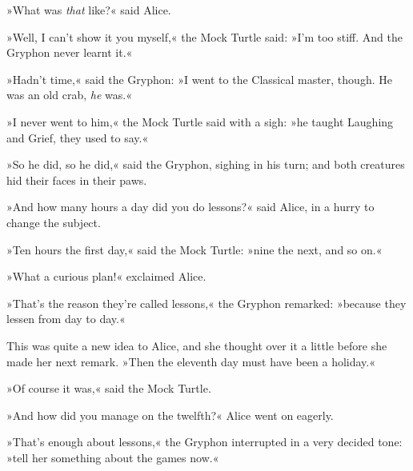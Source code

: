 »What was \textit{that} like?« said Alice.

»Well, I can't show it you myself,« the Mock Turtle said: »I'm too stiff. And the Gryphon never learnt it.«

»Hadn't time,« said the Gryphon: »I went to the Classical master, though. He was an old crab, \textit{he} was.«

»I never went to him,« the Mock Turtle said with a sigh: »he taught Laughing and Grief, they used to say.«

»So he did, so he did,« said the Gryphon, sighing in his turn; and both creatures hid their faces in their paws.

»And how many hours a day did you do lessons?« said Alice, in a hurry to change the subject.

»Ten hours the first day,« said the Mock Turtle: »nine the next, and so on.«

»What a curious plan!« exclaimed Alice.

»That's the reason they're called lessons,« the Gryphon remarked: »because they lessen from day to day.«

This was quite a new idea to Alice, and she thought over it a little before she made her next remark. »Then the eleventh day must have been a holiday.«

»Of course it was,« said the Mock Turtle.

»And how did you manage on the twelfth?« Alice went on eagerly.

»That's enough about lessons,« the Gryphon interrupted in a very decided tone: »tell her something about the games now.«